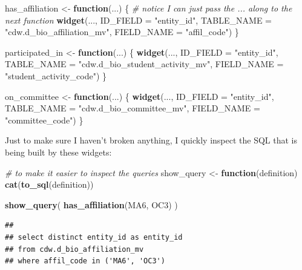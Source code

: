 \documentclass[]{book}
\newenvironment{Shaded}{\begin{snugshade}}{\end{snugshade}}
\newcommand{\CommentTok}[1]{\textcolor[rgb]{0.56,0.35,0.01}{\textit{#1}}}
\newcommand{\ControlFlowTok}[1]{\textcolor[rgb]{0.13,0.29,0.53}{\textbf{#1}}}
\newcommand{\DataTypeTok}[1]{\textcolor[rgb]{0.13,0.29,0.53}{#1}}
\newcommand{\KeywordTok}[1]{\textcolor[rgb]{0.13,0.29,0.53}{\textbf{#1}}}
\newcommand{\NormalTok}[1]{#1}
\newcommand{\StringTok}[1]{\textcolor[rgb]{0.31,0.60,0.02}{#1}}
\begin{document}
\begin{Shaded}
\begin{Highlighting}[]
\NormalTok{has_affiliation <-}\StringTok{ }\ControlFlowTok{function}\NormalTok{(...) \{}
    \CommentTok{# notice I can just pass the ... along to the next function}
    \KeywordTok{widget}\NormalTok{(...,}
           \DataTypeTok{ID_FIELD =} \StringTok{"entity_id"}\NormalTok{,}
           \DataTypeTok{TABLE_NAME =} \StringTok{"cdw.d_bio_affiliation_mv"}\NormalTok{,}
           \DataTypeTok{FIELD_NAME =} \StringTok{"affil_code"}\NormalTok{)}
\NormalTok{\}}

\NormalTok{participated_in <-}\StringTok{ }\ControlFlowTok{function}\NormalTok{(...) \{}
    \KeywordTok{widget}\NormalTok{(...,}
           \DataTypeTok{ID_FIELD =} \StringTok{"entity_id"}\NormalTok{,}
           \DataTypeTok{TABLE_NAME =} \StringTok{"cdw.d_bio_student_activity_mv"}\NormalTok{,}
           \DataTypeTok{FIELD_NAME =} \StringTok{"student_activity_code"}\NormalTok{)}
\NormalTok{\}}

\NormalTok{on_committee <-}\StringTok{ }\ControlFlowTok{function}\NormalTok{(...) \{}
    \KeywordTok{widget}\NormalTok{(...,}
           \DataTypeTok{ID_FIELD =} \StringTok{"entity_id"}\NormalTok{,}
           \DataTypeTok{TABLE_NAME =} \StringTok{"cdw.d_bio_committee_mv"}\NormalTok{,}
           \DataTypeTok{FIELD_NAME =} \StringTok{"committee_code"}\NormalTok{)}
\NormalTok{\}}
\end{Highlighting}
\end{Shaded}

Just to make sure I haven't broken anything, I quickly inspect the SQL that is being built by these widgets:

\begin{Shaded}
\begin{Highlighting}[]
\CommentTok{# to make it easier to inspect the queries}
\NormalTok{show_query <-}\StringTok{ }\ControlFlowTok{function}\NormalTok{(definition) }\KeywordTok{cat}\NormalTok{(}\KeywordTok{to_sql}\NormalTok{(definition))}

\KeywordTok{show_query}\NormalTok{( }\KeywordTok{has_affiliation}\NormalTok{(MA6, OC3) ) }
\end{Highlighting}
\end{Shaded}

\begin{verbatim}
## 
## select distinct entity_id as entity_id
## from cdw.d_bio_affiliation_mv
## where affil_code in ('MA6', 'OC3')
\end{verbatim}
\end{document}

